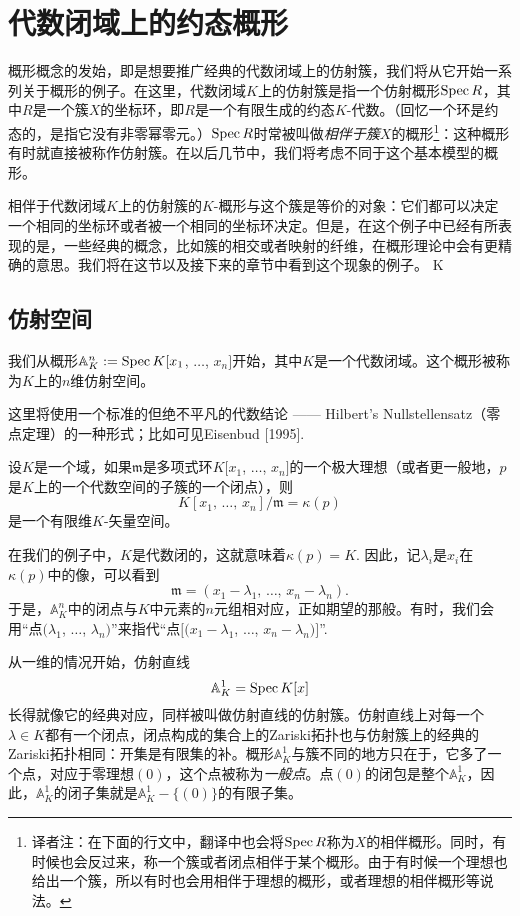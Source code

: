 \section{代数闭域上的约态概形}

概形概念的发始，即是想要推广经典的代数闭域上的仿射簇，我们将从它开始一系列关于概形的例子。在这里，代数闭域$K$上的仿射簇是指一个仿射概形$\operatorname{Spec} R$，其中$R$是一个簇$X$的坐标环，即$R$是一个有限生成的约态$K$\hyp 代数。（回忆一个环是约态的，是指它没有非零幂零元。）$\operatorname{Spec} R$时常被叫做\textit{相伴于簇$X$}的概形\footnote{译者注：在下面的行文中，翻译中也会将$\operatorname{Spec} R$称为$X$的相伴概形。同时，有时候也会反过来，称一个簇或者闭点相伴于某个概形。由于有时候一个理想也给出一个簇，所以有时也会用相伴于理想的概形，或者理想的相伴概形等说法。}：这种概形有时就直接被称作仿射簇。在以后几节中，我们将考虑不同于这个基本模型的概形。

相伴于代数闭域$K$上的仿射簇的$K$\hyp 概形与这个簇是等价的对象：它们都可以决定一个相同的坐标环或者被一个相同的坐标环决定。但是，在这个例子中已经有所表现的是，一些经典的概念，比如簇的相交或者映射的纤维，在概形理论中会有更精确的意思。我们将在这节以及接下来的章节中看到这个现象的例子。
K
\subsection{仿射空间}

我们从概形$\mathbb{A}^n_K:=\operatorname{Spec} K[x_1$, $\dots$, $x_n]$开始，其中$K$是一个代数闭域。这个概形被称为$K$上的$n$维仿射空间。

这里将使用一个标准的但绝不平凡的代数结论 ------ Hilbert's Nullstellensatz（零点定理）的一种形式；比如可见Eisenbud [1995].

\begin{thm}[Nullstellensatz]
	设$K$是一个域，如果$\mathfrak{m}$是多项式环$K[x_1$, $\dots$, $x_n]$的一个极大理想（或者更一般地，$p$是$K$上的一个代数空间的子簇的一个闭点），则
	\[
		K[x_1\text{, }\dots\text{, }x_n]/\mathfrak{m}=\kappa(p)
	\]
	是一个有限维$K$\hyp 矢量空间。
\end{thm}

在我们的例子中，$K$是代数闭的，这就意味着$\kappa(p)=K$. 因此，记$\lambda_i$是$x_i$在$\kappa(p)$中的像，可以看到
\[
	\mathfrak{m}=(x_1-\lambda_1\text{, }\dots\text{, }x_n-\lambda_n).
\]
于是，$\mathbb{A}^n_K$中的闭点与$K$中元素的$n$元组相对应，正如期望的那般。有时，我们会用“点$(\lambda_1$, $\dots$, $\lambda_n)$”来指代“点$[(x_1-\lambda_1$, $\dots$, $x_n-\lambda_n)]$”. 

从一维的情况开始，仿射直线
\[
	\mathbb{A}^1_K=\operatorname{Spec} K[x]
\]
长得就像它的经典对应，同样被叫做仿射直线的仿射簇。仿射直线上对每一个$\lambda\in K$都有一个闭点，闭点构成的集合上的Zariski拓扑也与仿射簇上的经典的Zariski拓扑相同：开集是有限集的补。概形$\mathbb{A}^1_K$与簇不同的地方只在于，它多了一个点，对应于零理想$(0)$，这个点被称为\textit{一般点}。点$(0)$的闭包是整个$\mathbb{A}^1_K$，因此，$\mathbb{A}^1_K$的闭子集就是$\mathbb{A}^1_K-\{(0)\}$的有限子集。

